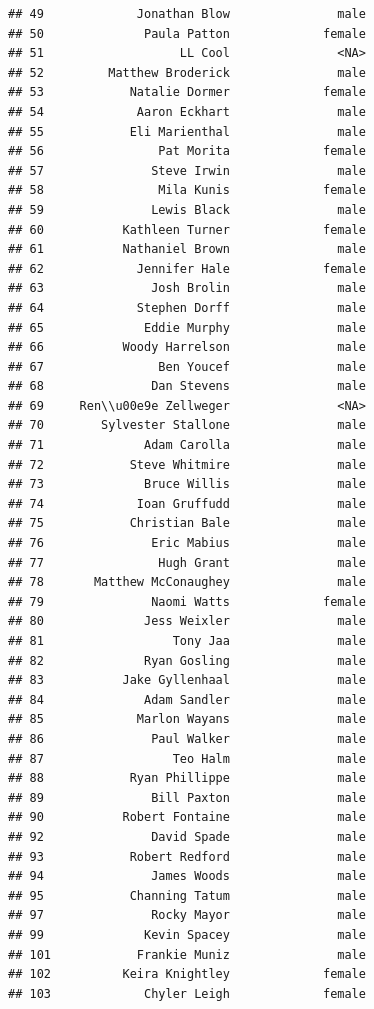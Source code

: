 \documentclass[
]{article}
\begin{document}
\begin{verbatim}
## 49             Jonathan Blow               male
## 50              Paula Patton             female
## 51                   LL Cool               <NA>
## 52         Matthew Broderick               male
## 53            Natalie Dormer             female
## 54             Aaron Eckhart               male
## 55            Eli Marienthal               male
## 56                Pat Morita             female
## 57               Steve Irwin               male
## 58                Mila Kunis             female
## 59               Lewis Black               male
## 60           Kathleen Turner             female
## 61           Nathaniel Brown               male
## 62             Jennifer Hale             female
## 63               Josh Brolin               male
## 64             Stephen Dorff               male
## 65              Eddie Murphy               male
## 66           Woody Harrelson               male
## 67                Ben Youcef               male
## 68               Dan Stevens               male
## 69     Ren\\u00e9e Zellweger               <NA>
## 70        Sylvester Stallone               male
## 71              Adam Carolla               male
## 72            Steve Whitmire               male
## 73              Bruce Willis               male
## 74             Ioan Gruffudd               male
## 75            Christian Bale               male
## 76               Eric Mabius               male
## 77                Hugh Grant               male
## 78       Matthew McConaughey               male
## 79               Naomi Watts             female
## 80              Jess Weixler               male
## 81                  Tony Jaa               male
## 82              Ryan Gosling               male
## 83           Jake Gyllenhaal               male
## 84              Adam Sandler               male
## 85             Marlon Wayans               male
## 86               Paul Walker               male
## 87                  Teo Halm               male
## 88            Ryan Phillippe               male
## 89               Bill Paxton               male
## 90           Robert Fontaine               male
## 92               David Spade               male
## 93            Robert Redford               male
## 94               James Woods               male
## 95            Channing Tatum               male
## 97               Rocky Mayor               male
## 99              Kevin Spacey               male
## 101            Frankie Muniz               male
## 102          Keira Knightley             female
## 103             Chyler Leigh             female

\end{verbatim}
\end{document}

